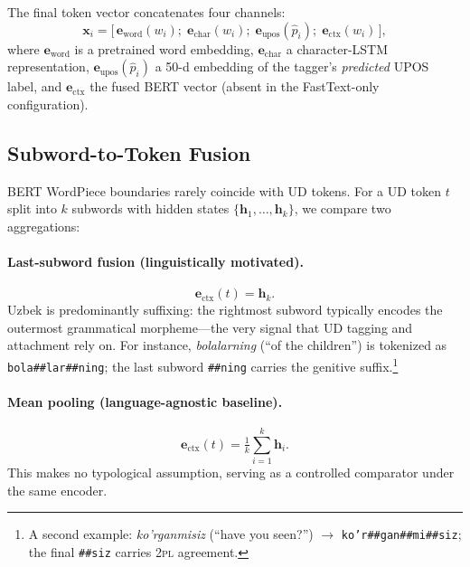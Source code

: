 \documentclass[runningheads]{llncs}
\begin{document}
The final token vector concatenates four channels:
\begin{equation}
  \mathbf{x}_i =
  \big[\,
    \mathbf{e}_{\text{word}}(w_i);\;
    \mathbf{e}_{\text{char}}(w_i);\;
    \mathbf{e}_{\text{upos}}(\hat{p}_i);\;
    \mathbf{e}_{\text{ctx}}(w_i)
  \,\big],
  \label{eq:tokenvec}
\end{equation}
where $\mathbf{e}_{\text{word}}$ is a pretrained word embedding, $\mathbf{e}_{\text{char}}$ a character-LSTM representation, $\mathbf{e}_{\text{upos}}(\hat{p}_i)$ a 50-d embedding of the tagger's \emph{predicted} UPOS label, and $\mathbf{e}_{\text{ctx}}$ the fused BERT vector (absent in the FastText-only configuration).

\subsection{Subword-to-Token Fusion}
\label{sec:method_fusion}

BERT WordPiece boundaries rarely coincide with UD tokens.
For a UD token $t$ split into $k$ subwords with hidden states $\{\mathbf{h}_1,\dots,\mathbf{h}_k\}$, we compare two aggregations:

\paragraph{Last-subword fusion (linguistically motivated).}
\begin{equation}
  \mathbf{e}_{\text{ctx}}(t) = \mathbf{h}_k .
  \label{eq:lastsub}
\end{equation}
Uzbek is predominantly suffixing: the rightmost subword typically encodes the outermost grammatical morpheme---the very signal that UD tagging and attachment rely on.
For instance, \textit{bolalarning} (``of the children'') is tokenized as \texttt{bola\;\#\#lar\;\#\#ning}; the last subword \texttt{\#\#ning} carries the genitive suffix.\footnote{A second example: \textit{ko'rganmisiz} (``have you seen?'') $\to$ \texttt{ko'r\;\#\#gan\;\#\#mi\;\#\#siz}; the final \texttt{\#\#siz} carries 2\textsc{pl} agreement.}

\paragraph{Mean pooling (language-agnostic baseline).}
\begin{equation}
  \mathbf{e}_{\text{ctx}}(t) = \tfrac{1}{k}\textstyle\sum_{i=1}^{k}\mathbf{h}_i .
  \label{eq:meanpool}
\end{equation}
This makes no typological assumption, serving as a controlled comparator under the same encoder.
\end{document}
